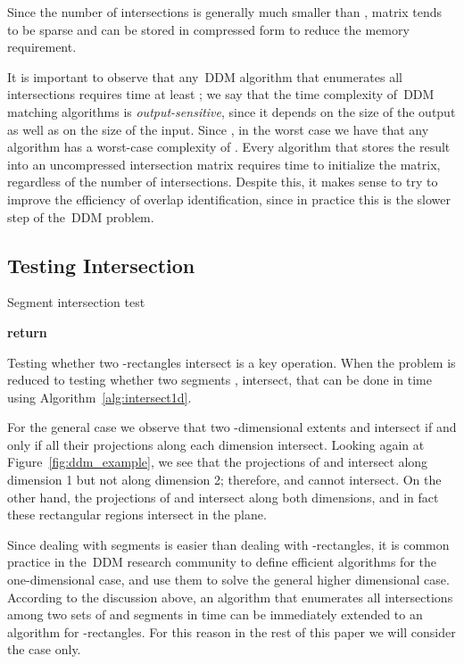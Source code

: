 \documentclass[10pt, conference, compsocconf]{IEEEtran}
\begin{document}
Since the number of intersections is generally much smaller than , matrix  tends to be sparse and can be stored in
compressed form to reduce the memory requirement.

It is important to observe that any~\ac{DDM} algorithm that enumerates
all  intersections requires time at least ; we say that
the time complexity of~\ac{DDM} matching algorithms is
\emph{output-sensitive}, since it depends on the size of the output as
well as on the size of the input. Since , in the worst case
we have that any algorithm has a worst-case complexity of
. Every algorithm that stores the result into an uncompressed
intersection matrix requires time  to initialize the matrix,
regardless of the number of intersections. Despite this, it makes
sense to try to improve the efficiency of overlap identification,
since in practice this is the slower step of the~\ac{DDM} problem.

\subsection{Testing Intersection}\label{sec:testing-intersection}

\begin{algorithm}[t]
\caption{Segment intersection test}\label{alg:intersect1d}
\begin{algorithmic}
\State \textbf{return} 
\EndFunction
\end{algorithmic}
\end{algorithm}

Testing whether two -rectangles intersect is a key operation. When
 the problem is reduced to testing whether two segments
,  intersect, that can be done in time  using
Algorithm~\ref{alg:intersect1d}.

For the general case  we observe that two -dimensional extents
 and  intersect if and only if all their projections along
each dimension intersect. Looking again at
Figure~\ref{fig:ddm_example}, we see that the projections of  and
 intersect along dimension 1 but not along dimension 2;
therefore,  and  cannot intersect. On the other hand, the
projections of  and  intersect along both dimensions, and in
fact these rectangular regions intersect in the plane.

Since dealing with segments is easier than dealing with
-rectangles, it is common practice in the~\ac{DDM} research
community to define efficient algorithms for the one-dimensional case,
and use them to solve the general higher dimensional case. According
to the discussion above, an algorithm that enumerates all
intersections among two sets of  and  segments in time
 can be immediately extended to an  algorithm for -rectangles.  For this reason
in the rest of this paper we will consider the case  only.
\end{document}
